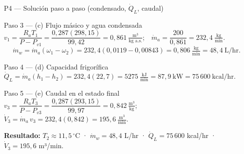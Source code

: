 \documentclass[aspectratio=169,10pt]{beamer}
\begin{document}
\begin{frame}{P4 --- Solución paso a paso (condensado, $\dot Q_L$, caudal)}
\begin{cardidea}{Paso 3 --- (c) Flujo másico y agua condensada}{\faTint}
{\footnotesize
$v_1=\dfrac{R_a T_1}{P-P_{v1}}=\dfrac{0{,}287(298{,}15)}{99{,}42}=0{,}861\ \tfrac{\text{m}^3}{\text{kg a.s.}}$;\ \ $\dot m_a=\dfrac{200}{0{,}861}=232{,}4\ \tfrac{\text{kg}}{\text{min}}$.
$$\dot m_w=\dot m_a(\omega_1-\omega_2)=232{,}4(0{,}0119-0{,}00843)=0{,}806\ \tfrac{\text{kg}}{\text{min}}=48{,}4\ \text{L/hr}.$$}
\end{cardidea}
\vspace{0.6mm}
\begin{cardgear}{Paso 4 --- (d) Capacidad frigorífica}{\faSnowflake}
{\footnotesize
$\dot Q_L=\dot m_a(h_1-h_2)=232{,}4(22{,}7)=5275\ \tfrac{\text{kJ}}{\text{min}}=87{,}9\ \text{kW}=75\,600\ \text{kcal/hr}.$}
\end{cardgear}
\vspace{0.6mm}
\begin{cardidea}{Paso 5 --- (e) Caudal en el estado final}{\faListOl}
{\footnotesize
$v_3=\dfrac{R_a T_3}{P-P_{v3}}=\dfrac{0{,}287(293{,}15)}{99{,}97}=0{,}842\ \tfrac{\text{m}^3}{\text{kg}}$;\ \ $\dot V_3=\dot m_a\,v_3=232{,}4(0{,}842)=195{,}6\ \tfrac{\text{m}^3}{\text{min}}$.}
\end{cardidea}
\vspace{0.5mm}
\begin{cardnota}[\faListOl]
{\footnotesize\textbf{Resultado:} $T_2\approx11{,}5\,^\circ$C · $\dot m_w=48{,}4$ L/hr · $\dot Q_L=75\,600$ kcal/hr · $\dot V_3=195{,}6$ m³/min.}
\end{cardnota}
\end{frame}
\end{document}
